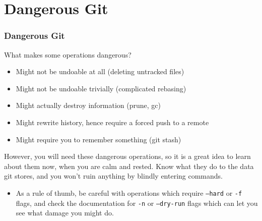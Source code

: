 \section{Dangerous Git}

\begin{frame}[fragile]
\frametitle{Dangerous Git}
What makes some operations dangerous?
\begin{itemize}
\item Might not be undoable at all (deleting untracked files)
\item Might not be undoable trivially (complicated rebasing)
\item Might actually destroy information (prune, gc)
\item Might rewrite history, hence require a forced push to a remote
\item Might require you to remember something (git stash)
\end{itemize}
However, you will need these dangerous operations, so it is a great idea to learn about them now, when you are calm and rested. Know what they do to the data git stores, and you won't ruin anything by blindly entering commands.
\begin{itemize}
\item As a rule of thumb, be careful with operations which require \texttt{--hard} or \texttt{-f} flags, and check the documentation for \texttt{-n} or \texttt{--dry-run} flags which can let you see what damage you might do.
\end{itemize}
\end{frame}

